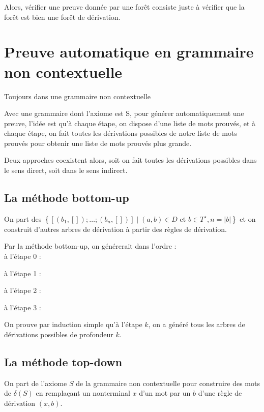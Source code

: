 \documentclass[a4paper,12pt]{article}
\newcommand{\norm}[1]{\lvert #1 \rvert}
\begin{document}

Alors, vérifier une preuve donnée par une forêt consiste juste à vérifier que la forêt est bien une forêt de dérivation.

\section{Preuve automatique en grammaire non contextuelle}

Toujours dans une grammaire non contextuelle

Avec une grammaire dont l'axiome est S,
pour générer automatiquement une preuve, l'idée est qu'à chaque étape,
on dispose d'une liste de mots prouvés,
et à chaque étape, on fait toutes les dérivations possibles de notre liste de mots prouvés pour obtenir une liste de mots prouvés plus grande.

Deux approches coexistent alors, soit on fait toutes les dérivations possibles dans le sens direct, soit dans le sens indirect.

\subsection{La méthode bottom-up}

On part des $\left\{ [(b_1,[]);\dots;(b_n,[])] \mid (a,b)\in D \text{ et } b \in T^\star , n = \norm{b}\right\}$ et on construit d'autres arbres de dérivation à partir des règles de dérivation.

Par la méthode bottom-up, on générerait dans l'ordre :\\
à l'étape 0 :
 
à l'étape 1 : 
 
à l'étape 2 : 
 
à l'étape 3 : 
 

On prouve par induction simple qu'à l'étape $k$, on a généré tous les arbres de dérivations possibles de profondeur $k$.

\subsection{La méthode top-down}

On part de l'axiome $S$ de la grammaire non contextuelle pour construire des mots de $\delta(S)$ en remplaçant un nonterminal $x$ d'un mot par un $b$ d'une règle de dérivation $(x,b)$.
\end{document}
